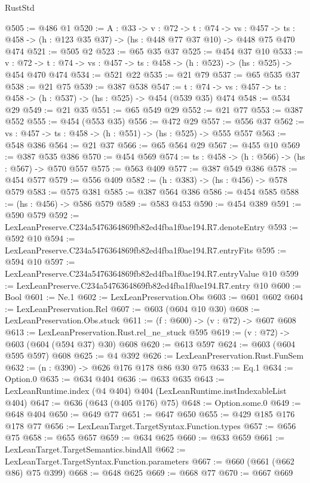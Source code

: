 \begin{lexlean}{RustStd}
\begin{coremodule}
@505 := @486 @1
@520 := {A : @33} ->
  {v : @72} ->
  {t : @74} ->
  {vs : @457} -> {ts : @458} -> (h : @123 @35 @37) -> (hs : @448 @77 @37 @10) -> @448 @75 @470 @474
@521 := @505 @2
@523 := @65 @35 @37
@525 := @454 @37 @10
@533 := {v : @72} ->
  {t : @74} -> {vs : @457} -> {ts : @458} -> (h : @523) -> (hs : @525) -> @454 @470 @474
@534 := @521 @22
@535 := @21 @79
@537 := @65 @535 @37
@538 := @21 @75
@539 := @387 @538
@547 := {t : @74} -> {vs : @457} -> {ts : @458} -> (h : @537) -> (hs : @525) -> @454 (@539 @35) @474
@548 := @534 @29
@549 := @21 @35
@551 := @65 @549 @29
@552 := @21 @77
@553 := @387 @552
@555 := @454 (@553 @35)
@556 := @472 @29
@557 := @556 @37
@562 := {vs : @457} -> {ts : @458} -> (h : @551) -> (hs : @525) -> @555 @557
@563 := @548 @386
@564 := @21 @37
@566 := @65 @564 @29
@567 := @455 @10
@569 := @387 @535 @386
@570 := @454 @569
@574 := {ts : @458} -> (h : @566) -> (hs : @567) -> @570 @557
@575 := @563 @409
@577 := @387 @549 @386
@578 := @454 @577
@579 := @556 @409
@582 := (h : @383) -> (hs : @456) -> @578 @579
@583 := @575 @381
@585 := @387 @564 @386
@586 := @454 @585
@588 := (hs : @456) -> @586 @579
@589 := @583 @453
@590 := @454 @389
@591 := @590 @579
@592 := LexLeanPreserve.C234a5476364869fb82ed4fba1f0ae194.R7.denoteEntry
@593 := @592 @10
@594 := LexLeanPreserve.C234a5476364869fb82ed4fba1f0ae194.R7.entryFits
@595 := @594 @10
@597 := LexLeanPreserve.C234a5476364869fb82ed4fba1f0ae194.R7.entryValue @10
@599 := LexLeanPreserve.C234a5476364869fb82ed4fba1f0ae194.R7.entry @10
@600 := Bool
@601 := Ne.{1}
@602 := LexLeanPreservation.Obs
@603 := @601 @602
@604 := LexLeanPreservation.Rel
@607 := @603 (@604 @10 @30)
@608 := LexLeanPreservation.Obs.stuck
@611 := (f : @600) -> (v : @72) -> @607 @608
@613 := LexLeanPreservation.Rust.rel_ne_stuck @595
@619 := (v : @72) -> @603 (@604 (@594 @37) @30) @608
@620 := @613 @597
@624 := @603 (@604 @595 @597) @608
@625 := @4 @392
@626 := LexLeanPreservation.Rust.FunSem
@632 := (n : @390) -> @626 @176 @178 @86 @30 @75
@633 := Eq.{1}
@634 := Option.{0}
@635 := @634 @404
@636 := @633 @635
@643 := LexLeanRuntime.index (@4 @404) @404 (LexLeanRuntime.instIndexableList @404)
@647 := @636 (@643 (@405 @176) @75)
@648 := Option.some.{0}
@649 := @648 @404
@650 := @649 @77
@651 := @647 @650
@655 := @429 @185 @176 @178 @77
@656 := LexLeanTarget.TargetSyntax.Function.types
@657 := @656 @75
@658 := @655 @657
@659 := @634 @625
@660 := @633 @659
@661 := LexLeanTarget.TargetSemantics.bindAll
@662 := LexLeanTarget.TargetSyntax.Function.parameters
@667 := @660 (@661 (@662 @86) @75 @399)
@668 := @648 @625
@669 := @668 @77
@670 := @667 @669

\end{coremodule}
\end{lexlean}
